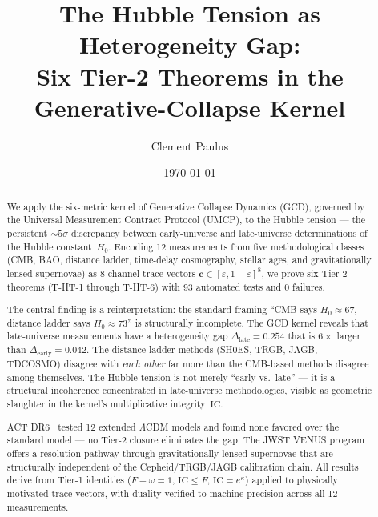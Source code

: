 \documentclass[
  aps,
  prd,
  twocolumn,
  superscriptaddress,
  nofootinbib,
  floatfix
]{revtex4-2}
\newcommand{\eps}{\varepsilon}
\newcommand{\tvec}{\mathbf{c}}
\newcommand{\IC}{\mathrm{IC}}
\newcommand{\hetgap}{\Delta}
\newcommand{\Fid}{F}
\newcommand{\Drft}{\omega}
\newcommand{\Logint}{\kappa}
\begin{document}
\title{The Hubble Tension as Heterogeneity Gap:\\
Six Tier-2 Theorems in the Generative-Collapse Kernel}

\author{Clement Paulus}

\date{\today}

\begin{abstract}
We apply the six-metric kernel of Generative Collapse Dynamics
(GCD), governed by the Universal Measurement Contract Protocol
(UMCP), to the Hubble tension --- the persistent $\sim\!5\sigma$
discrepancy between early-universe and late-universe
determinations of the Hubble constant~$H_0$.
Encoding 12 measurements from five methodological classes
(CMB, BAO, distance ladder, time-delay cosmography, stellar
ages, and gravitationally lensed supernovae) as 8-channel
trace vectors $\tvec \in [\eps, 1{-}\eps]^{8}$, we prove
six Tier-2 theorems (T-HT-1 through T-HT-6) with 93 automated
tests and 0 failures.

The central finding is a reinterpretation: the standard framing
``CMB says $H_0 \approx 67$, distance ladder says $H_0 \approx 73$''
is structurally incomplete.
The GCD kernel reveals that late-universe measurements have a
heterogeneity gap $\hetgap_{\mathrm{late}} = 0.254$ that is
$6\times$ larger than $\hetgap_{\mathrm{early}} = 0.042$.
The distance ladder methods (SH0ES, TRGB, JAGB, TDCOSMO)
disagree with \emph{each other} far more than the CMB-based
methods disagree among themselves.
The Hubble tension is not merely ``early vs.\ late'' --- it is
a structural incoherence concentrated in late-universe methodologies,
visible as geometric slaughter in the kernel's multiplicative
integrity~$\IC$.

ACT DR6~\cite{louis2025act_dr6,calabrese2025act_ext} tested
12 extended $\Lambda$CDM models and found none favored over
the standard model --- no Tier-2 closure eliminates the gap.
The JWST VENUS program~\cite{venus2026} offers a resolution
pathway through gravitationally lensed supernovae that are
structurally independent of the Cepheid/TRGB/JAGB calibration
chain.
All results derive from Tier-1 identities
($\Fid + \Drft = 1$, $\IC \leq \Fid$, $\IC = e^{\Logint}$)
applied to physically motivated trace vectors, with duality
verified to machine precision across all 12 measurements.
\end{abstract}
\end{document}
